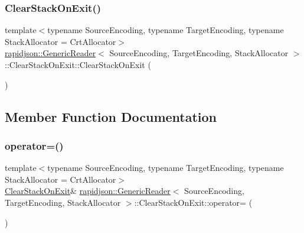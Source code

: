 \subsubsection{\texorpdfstring{ClearStackOnExit()}{ClearStackOnExit()}\hspace{0.1cm}{\footnotesize\ttfamily [2/2]}}
{\footnotesize\ttfamily template$<$typename Source\+Encoding, typename Target\+Encoding, typename Stack\+Allocator = Crt\+Allocator$>$ \\
\mbox{\hyperlink{classrapidjson_1_1_generic_reader}{rapidjson\+::\+Generic\+Reader}}$<$ Source\+Encoding, Target\+Encoding, Stack\+Allocator $>$\+::Clear\+Stack\+On\+Exit\+::\+Clear\+Stack\+On\+Exit (\begin{DoxyParamCaption}\item[{const \mbox{\hyperlink{structrapidjson_1_1_generic_reader_1_1_clear_stack_on_exit}{Clear\+Stack\+On\+Exit}} \&}]{ }\end{DoxyParamCaption})\hspace{0.3cm}{\ttfamily [private]}}



\subsection{Member Function Documentation}
\mbox{\label{structrapidjson_1_1_generic_reader_1_1_clear_stack_on_exit_a7d7c23188f019af93c24d46eec7500de}} 
\subsubsection{\texorpdfstring{operator=()}{operator=()}}
{\footnotesize\ttfamily template$<$typename Source\+Encoding, typename Target\+Encoding, typename Stack\+Allocator = Crt\+Allocator$>$ \\
\mbox{\hyperlink{structrapidjson_1_1_generic_reader_1_1_clear_stack_on_exit}{Clear\+Stack\+On\+Exit}}\& \mbox{\hyperlink{classrapidjson_1_1_generic_reader}{rapidjson\+::\+Generic\+Reader}}$<$ Source\+Encoding, Target\+Encoding, Stack\+Allocator $>$\+::Clear\+Stack\+On\+Exit\+::operator= (\begin{DoxyParamCaption}\item[{const \mbox{\hyperlink{structrapidjson_1_1_generic_reader_1_1_clear_stack_on_exit}{Clear\+Stack\+On\+Exit}} \&}]{ }\end{DoxyParamCaption})\hspace{0.3cm}{\ttfamily [private]}}



